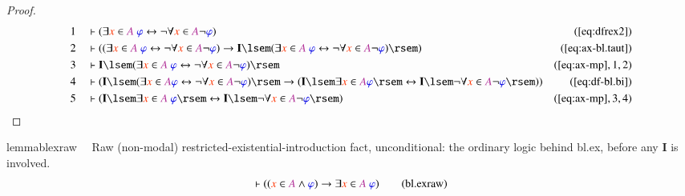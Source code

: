 \begin{proof}
\begin{align}
  1 &&  & \vdash ( \exists \msc{x} \in \mc{A}~\mw{\varphi} \leftrightarrow
      \lnot \forall \msc{x} \in \mc{A} \lnot \mw{\varphi}
      )&(\mbox{\ref{eq:dfrex2}})\notag
  \\ 2 &&  & \vdash ( ( \exists \msc{x} \in \mc{A}~\mw{\varphi} \leftrightarrow
      \lnot \forall \msc{x} \in \mc{A} \lnot \mw{\varphi} )
      \rightarrow \mathbf{I} \lsem ( \exists \msc{x} \in
      \mc{A}~\mw{\varphi} \leftrightarrow \lnot \forall
      \msc{x} \in \mc{A} \lnot \mw{\varphi} ) \rsem
      )&(\mbox{\ref{eq:ax-bl.taut}})\notag
  \\ 3 &&  & \vdash \mathbf{I} \lsem ( \exists \msc{x} \in \mc{A}~\mw{\varphi}
      \leftrightarrow \lnot \forall \msc{x} \in \mc{A}
      \lnot \mw{\varphi} )
      \rsem&(\mbox{\ref{eq:ax-mp}},1,2)\notag
  \\ 4 &&  & \vdash ( \mathbf{I} \lsem ( \exists \msc{x} \in \mc{A}
      \mw{\varphi} \leftrightarrow \lnot \forall \msc{x}
      \in \mc{A} \lnot \mw{\varphi} ) \rsem \rightarrow
      ( \mathbf{I} \lsem \exists \msc{x} \in \mc{A}
      \mw{\varphi} \rsem \leftrightarrow \mathbf{I} \lsem
      \lnot \forall \msc{x} \in \mc{A} \lnot \mw{\varphi}
      \rsem ) )&(\mbox{\ref{eq:df-bl.bi}})\notag
  \\ 5 &&  & \vdash ( \mathbf{I} \lsem \exists \msc{x} \in \mc{A}~\mw{\varphi}
      \rsem \leftrightarrow \mathbf{I} \lsem \lnot \forall
      \msc{x} \in \mc{A} \lnot \mw{\varphi} \rsem
      )&(\mbox{\ref{eq:ax-mp}},3,4)\notag
\end{align}
\end{proof}

\begin{restatable}{lemma}{blexraw}~~ Raw (non-modal) restricted-existential-introduction
fact, unconditional: the ordinary logic behind bl.ex, before any $\mathbf{I}$ is
involved.
\begin{align}
\vdash ( ( \msc{x} \in \mc{A} \wedge \mw{\varphi} ) \rightarrow \exists
    \msc{x} \in \mc{A}~\mw{\varphi} )\label{eq:bl.exraw}\tag{bl.exraw}
\end{align}
\end{restatable}

